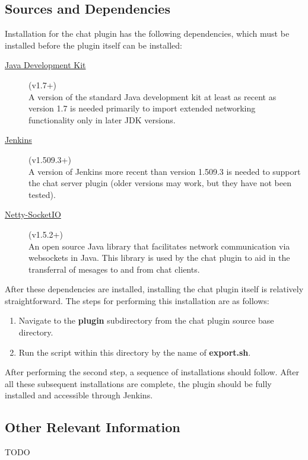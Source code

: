 \documentclass{article}
\begin{document}
		\subsection[Dependencies]{Sources and Dependencies}
		Installation for the chat plugin has the following dependencies, which
		must be installed before the plugin itself can be installed:

		\begin{description}
			\item[\href{http://www.oracle.com/technetwork/java/javase/downloads/jdk7-downloads-1880260.html}{Java Development Kit}] (v1.7+) \hfill \\
			A version of the standard Java development kit at least as recent 
			as version 1.7 is needed primarily to import extended networking 
			functionality only in later JDK versions.

			\item[\href{http://jenkins-ci.org/}{Jenkins}] (v1.509.3+) \hfill \\
			A version of Jenkins more recent than version 1.509.3 is needed
			to support the chat server plugin (older versions may work, but they
			have not been tested).

			\item[\href{https://github.com/mrniko/netty-socketio/releases}{Netty-SocketIO}] (v1.5.2+) \hfill \\ 
			An open source Java library that facilitates network communication 
			via websockets in Java.  This library is used by the chat plugin
			to aid in the transferral of mesages to and from chat clients.
		\end{description}

		After these dependencies are installed, installing the chat plugin itself
		is relatively straightforward.  The steps for performing this installation
		are as follows:

		\begin{enumerate}
			\item Navigate to the \textbf{plugin} subdirectory from the chat
			plugin source base directory.

			\item Run the script within this directory by the name of 
			\textbf{export.sh}.
		\end{enumerate}

		After performing the second step, a sequence of installations should
		follow.  After all these subsequent installations are complete, the
		plugin should be fully installed and accessible through Jenkins.

		\subsection[Other Information]{Other Relevant Information}
		TODO
\end{document}
